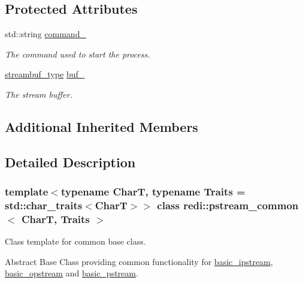 \subsection*{Protected Attributes}
\begin{DoxyCompactItemize}
\item 
\mbox{\label{classredi_1_1pstream__common_aa97d67284ce2fb39e26fa504d611b50c}} 
std\+::string \mbox{\hyperlink{classredi_1_1pstream__common_aa97d67284ce2fb39e26fa504d611b50c}{command\+\_\+}}
\begin{DoxyCompactList}\small\item\em The command used to start the process. \end{DoxyCompactList}\item 
\mbox{\label{classredi_1_1pstream__common_a59dd7e8a056e4e66d67f31c1ef0bfff4}} 
\mbox{\hyperlink{classredi_1_1basic__pstreambuf}{streambuf\+\_\+type}} \mbox{\hyperlink{classredi_1_1pstream__common_a59dd7e8a056e4e66d67f31c1ef0bfff4}{buf\+\_\+}}
\begin{DoxyCompactList}\small\item\em The stream buffer. \end{DoxyCompactList}\end{DoxyCompactItemize}
\subsection*{Additional Inherited Members}


\subsection{Detailed Description}
\subsubsection*{template$<$typename CharT, typename Traits = std\+::char\+\_\+traits$<$\+Char\+T$>$$>$\newline
class redi\+::pstream\+\_\+common$<$ Char\+T, Traits $>$}

Class template for common base class. 

Abstract Base Class providing common functionality for \mbox{\hyperlink{classredi_1_1basic__ipstream}{basic\+\_\+ipstream}}, \mbox{\hyperlink{classredi_1_1basic__opstream}{basic\+\_\+opstream}} and \mbox{\hyperlink{classredi_1_1basic__pstream}{basic\+\_\+pstream}}.

